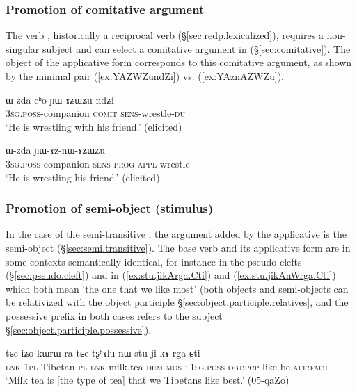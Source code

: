 \subsubsection{Promotion of comitative argument} \label{sec:applicative.comitative}
The verb , historically a reciprocal verb (§\ref{sec:redp.lexicalized}), requires a non-singular subject and can select a comitative argument in  (§\ref{sec:comitative}). The object of the applicative form  corresponds to this comitative argument, as shown by the minimal pair (\ref{ex:YAZWZundZi}) vs. (\ref{ex:YAznAZWZu}).

\begin{exe}
\ex \label{ex:YAZWZundZi}
\gll ɯ-zda cʰo ɲɯ-ɤʑɯʑu-ndʑi \\
\textsc{3sg}.\textsc{poss}-companion \textsc{comit} \textsc{sens}-wrestle-\textsc{du}  \\
\glt `He is wrestling with his friend.' (elicited)
\end{exe}

\begin{exe}
\ex \label{ex:YAznAZWZu}
\gll ɯ-zda ɲɯ-ɤz-nɯ-ɤʑɯʑu \\
\textsc{3sg}.\textsc{poss}-companion \textsc{sens}-\textsc{prog}-\textsc{appl}-wrestle \\
\glt `He is wrestling his friend.' (elicited)
\end{exe}

\subsubsection{Promotion of semi-object (stimulus)} \label{sec:applicative.semi.object}
In the case of the semi-transitive , the argument added by the applicative is the semi-object (§\ref{sec:semi.transitive}). The base verb  and its applicative form  are in some contexts semantically identical, for instance in the pseudo-clefts  (§\ref{sec:pseudo.cleft})  and  in (\ref{ex:stu.jikArga.Cti}) and (\ref{ex:stu.jikAnWrga.Cti}) which both mean `the one that we like most' (both objects and semi-objects can be relativized with the object participle §\ref{sec:object.participle.relatives}, and the possessive prefix in both cases refers to the subject §\ref{sec:object.participle.possessive}).


\begin{exe}
\ex \label{ex:stu.jikArga.Cti}
\gll tɕe iʑo kɯrɯ ra tɕe tʂʰɤlu nɯ stu ji-kɤ-rga ɕti \\
\textsc{lnk} \textsc{1pl} Tibetan \textsc{pl} \textsc{lnk} milk.tea \textsc{dem} \textsc{most} \textsc{1sg}.\textsc{poss}-\textsc{obj}:\textsc{pcp}-like be.\textsc{aff}:\textsc{fact} \\
\glt `Milk tea is [the type of tea] that we Tibetans like best.' (05-qaZo)
\end{exe}

